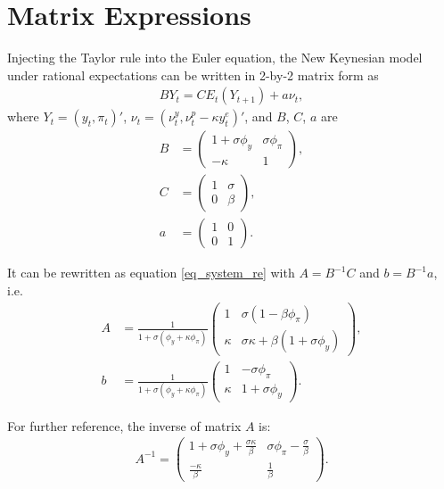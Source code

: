 \section{Matrix Expressions}\label{appendix_matrixexpressions}
Injecting the Taylor rule into the Euler equation, the New Keynesian model under rational expectations can be written in 2-by-2 matrix form as
\begin{align}
B Y_t = C E_t(Y_{t+1}) + a \nu_t,
\end{align}
where $Y_t = (y_t,\pi_t)'$, $\nu_t = (\nu_t^y,\nu_t^p-\kappa y_t^e)'$, and $B$, $C$, $a$ are
\begin{align}
B &= \begin{pmatrix} 1+\sigma \phi_y & \sigma \phi_{\pi} \\ -\kappa & 1 \end{pmatrix},\\
C &= \begin{pmatrix} 1 & \sigma \\ 0 & \beta \end{pmatrix},\\
a &= \begin{pmatrix} 1 & 0  \\ 0 & 1  \end{pmatrix}.
\end{align}

It can be rewritten as equation \eqref{eq_system_re} with $A=B^{-1}C$ and $b=B^{-1}a$, i.e.
\begin{align}
A &= \frac{1}{1+\sigma (\phi_y+\kappa \phi_{\pi})} \begin{pmatrix} 1 & \sigma (1-\beta \phi_{\pi})\\ \kappa & \sigma \kappa + \beta (1+\sigma \phi_y)\end{pmatrix},\label{eq_matrixA}\\
b &= \frac{1}{1+\sigma (\phi_y+\kappa \phi_{\pi})}\begin{pmatrix} 1 & -\sigma \phi_{\pi} \\ \kappa & 1+\sigma \phi_y \end{pmatrix}.
\end{align}

For further reference, the inverse of matrix $A$ is:
\begin{align}
A^{-1} = \begin{pmatrix} 1+\sigma \phi_y + \frac{\sigma\kappa}{\beta} & \sigma \phi_{\pi}-\frac{\sigma}{\beta}\\ \frac{-\kappa}{\beta} & \frac{1}{\beta}\end{pmatrix}.\label{eq_matrixinverseA}
\end{align}

